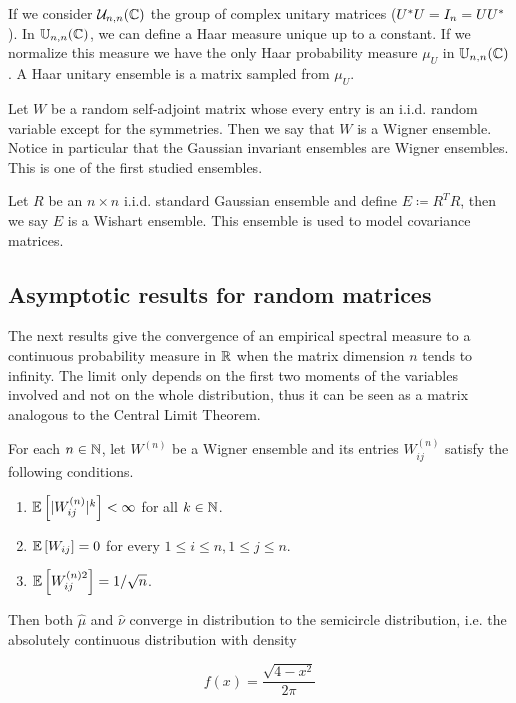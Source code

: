 \begin{example}
    If we consider $\mathcal U_{n,n}(\mathbb C)$ the group of complex unitary matrices ($U^*U = I_n = UU^*$). In $\mathbb U_{n,n}(\mathbb C)$, we can define  a Haar measure unique up to a constant. If we normalize this measure we have the only Haar probability measure $\mu_U$ in $\mathbb U_{n,n}(\mathbb C)$. A Haar unitary ensemble is a matrix sampled from $\mu_U$.
\end{example}

\begin{example}
    Let $W$ be a random self-adjoint matrix whose every entry is an i.i.d. random variable except for the symmetries. Then we say that $W$ is a Wigner ensemble. Notice in particular that the Gaussian invariant ensembles are Wigner ensembles. This is one of the first studied ensembles.
\end{example}

\begin{example}
    Let $R$ be an $n\times n$ i.i.d. standard Gaussian ensemble and define $E \coloneqq R^T R$, then we say $E$ is a Wishart ensemble. This ensemble is used to model covariance matrices. 
\end{example}

\subsection{Asymptotic results for random matrices}


The next results give the convergence of an empirical spectral measure to a continuous probability measure in $\mathbb R$ when the matrix dimension $n$ tends to infinity. The limit only depends on the first two moments of the variables involved and not on the whole distribution, thus it can be seen as a matrix analogous to the Central Limit Theorem.

\begin{theorem}
    For each $n\in \mathbb N$, let $W^{(n)}$ be a Wigner ensemble  and its entries $W_{ij}^{(n)}$ satisfy the following conditions.

    \begin{enumerate}
        \item $\mathbb E \left[ \lvert W_{ij}^{(n)} \rvert^k \right]<\infty$ for all $k\in \mathbb N$.
        \item $\mathbb E \left[ W_{ij} \right] = 0$ for every $1 \le i \le n, 1 \le j \le n$.
        \item $\mathbb E \left[  W_{ij}^{(n) 2}  \right] = 1/\sqrt{n}$.
    \end{enumerate}

    Then both $\hat\mu$ and $\hat\nu$ converge in distribution to the semicircle distribution, i.e. the absolutely continuous distribution with density

    \begin{equation*}
        f(x) = \frac{\sqrt{4 - x^2}}{2\pi}
    \end{equation*}
\end{theorem}